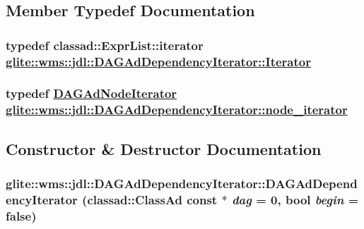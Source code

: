 \subsection{Member Typedef Documentation}
\hypertarget{structglite_1_1wms_1_1jdl_1_1DAGAdDependencyIterator_w1}{
\subsubsection[Iterator]{\setlength{\rightskip}{0pt plus 5cm}typedef classad::Expr\-List::iterator \hyperlink{structglite_1_1wms_1_1jdl_1_1DAGAdDependencyIterator_w1}{glite::wms::jdl::DAGAd\-Dependency\-Iterator::Iterator}}}
\label{structglite_1_1wms_1_1jdl_1_1DAGAdDependencyIterator_w1}


\hypertarget{structglite_1_1wms_1_1jdl_1_1DAGAdDependencyIterator_w0}{
\subsubsection[node\_\-iterator]{\setlength{\rightskip}{0pt plus 5cm}typedef \hyperlink{classglite_1_1wms_1_1jdl_1_1DAGAdNodeIterator}{DAGAd\-Node\-Iterator} \hyperlink{classglite_1_1wms_1_1jdl_1_1DAGAdNodeIterator}{glite::wms::jdl::DAGAd\-Dependency\-Iterator::node\_\-iterator}}}
\label{structglite_1_1wms_1_1jdl_1_1DAGAdDependencyIterator_w0}




\subsection{Constructor \& Destructor Documentation}
\hypertarget{structglite_1_1wms_1_1jdl_1_1DAGAdDependencyIterator_a2}{
\subsubsection[DAGAdDependencyIterator]{\setlength{\rightskip}{0pt plus 5cm}glite::wms::jdl::DAGAd\-Dependency\-Iterator::DAGAd\-Dependency\-Iterator (classad::Class\-Ad const $\ast$ {\em dag} = 0, bool {\em begin} = false)}}
\label{structglite_1_1wms_1_1jdl_1_1DAGAdDependencyIterator_a2}




